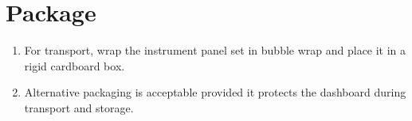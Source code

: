 \chapter{Package}\label{ch:package}

\begin{enumerate}
    \item For transport, wrap the instrument panel set in bubble wrap and place it in a rigid cardboard box.
    \item Alternative packaging is acceptable provided it protects the dashboard during transport and storage.
\end{enumerate}
